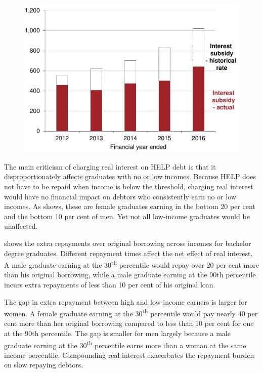 \documentclass[embargoed]{grattan}
\begin{document}
{\begin{figure}
\includegraphics[page=13]{atlas/Chartpack.pdf}
\end{figure}

The main criticism of charging real interest on \gls{HELP} debt is that it disproportionately affects graduates with no or low incomes.
Because \gls{HELP} does not have to be repaid when income is below the threshold, charging real interest would have no financial impact on debtors who consistently earn no or low incomes.
As  shows, these are female graduates earning in the bottom 20 per cent and the bottom 10 per cent of men.
Yet not all low-income graduates would be unaffected.

 shows the extra repayments over original borrowing across incomes for bachelor degree graduates.
Different repayment times affect the net effect of real interest.
A male graduate earning at the 30\textsuperscript{th} percentile would repay over 20 per cent more than his original borrowing, while a male graduate earning at the 90th percentile incurs extra repayments of less than 10 per cent of his original loan.

The gap in extra repayment between high and low-income earners is larger for women.
A female graduate earning at the 30\textsuperscript{th} percentile would pay nearly 40 per cent more than her original borrowing compared to less than 10 per cent for one at the 90th percentile.
The gap is smaller for men largely because a male graduate earning at the 30\textsuperscript{th} percentile earns more than a woman at the same income percentile.
Compounding real interest exacerbates the repayment burden on slow repaying debtors.


}
\end{document}
